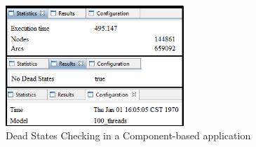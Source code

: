 
\begin{figure}[h]
	\centering
	\includegraphics[width=0.6\textwidth]{./img/asap}
	\caption{Dead States Checking in a Component-based application}
	\label{fig:ds}
\end{figure}

\fi